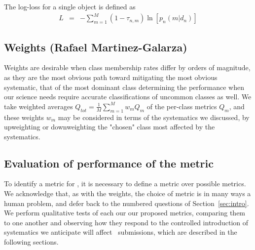 The log-loss for a single object is defined as
\begin{eqnarray}
L &=& -\sum_{m=1}^{M}(1-\tau_{n, m})\ln[p_{n}(m | d_{n})]
\end{eqnarray}

%

\subsection{Weights (Rafael Martinez-Galarza)}
\label{sec:weights}


Weights are desirable when class membership rates differ by orders of magnitude, as they are the most obvious path toward mitigating the most obvious systematic, that of the most dominant class determining the performance when our science needs require accurate classifications of uncommon classes as well.
We take weighted averages $Q_{tot} = \frac{1}{M}\sum_{m=1}^{M}w_{m}Q_{m}$ of the per-class metrics $Q_{m}$, and these weights $w_{m}$ may be considered in terms of the systematics we discussed, by upweighting or downweighting the "chosen" class most affected by the systematics.

\subsection{Evaluation of performance of the metric}
\label{sec:inception}

To identify a metric for \plasticc, it is necessary to define a metric over possible metrics.
We acknowledge that, as with the weights, the choice of metric is in many ways a human problem, and defer back to the numbered questions of Section~\ref{sec:intro}.
We perform qualitative tests of each our our proposed metrics, comparing them to one another and observing how they respond to the controlled introduction of systematics we anticipate will affect \plasticc\ submissions, which are described in the following sections.
